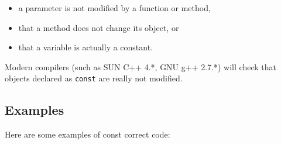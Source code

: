 \begin{itemize}
\item a  parameter is not modified by a function or method,
\item that a method does  not change its object, or
\item that a variable is actually a constant.
\end{itemize}

Modern compilers (such as SUN C++ 4.*, GNU g++ 2.7.*) will check that 
objects declared as \texttt{const} are really not modified.



%
%

\subsection{Examples}

Here are some examples of const correct code:


